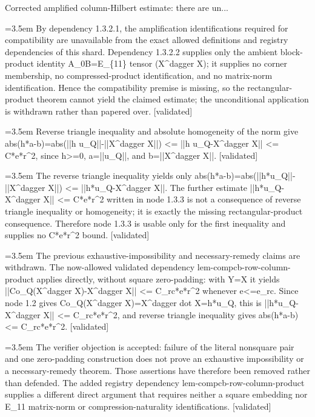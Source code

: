 \documentclass{article}
\newcommand{\step}[1]{\par\noindent\hangindent=3.5em\hangafter=1%
  \makebox[3.5em][l]{\textbf{#1.}}}
\newcommand{\steptag}[1]{\hfill{\small\textsf{[#1]}}}
\begin{document}
\begin{proofbox}{Corrected amplified column-Hilbert estimate: there are un...}
\step{1.3.2.3.2} By dependency 1.3.2.1, the amplification identifications required for compatibility are unavailable from the exact allowed definitions and registry dependencies of this shard. Dependency 1.3.2.2 supplies only the ambient block-product identity A\_0B=E\_\{11\} tensor (X\textasciicircum{}dagger X); it supplies no corner membership, no compressed-product identification, and no matrix-norm identification. Hence the compatibility premise is missing, so the rectangular-product theorem cannot yield the claimed estimate; the unconditional application is withdrawn rather than papered over. \steptag{validated} \\[4pt]
\step{1.3.3} Reverse triangle inequality and absolute homogeneity of the norm give abs(h*a-b)=abs(||h u\_Q||-||X\textasciicircum{}dagger X||) <= ||h u\_Q-X\textasciicircum{}dagger X|| <= C*e*r\textasciicircum{}2, since h>=0, a=||u\_Q||, and b=||X\textasciicircum{}dagger X||. \steptag{validated} \\[4pt]
\step{1.3.4} The reverse triangle inequality yields only abs(h*a-b)=abs(||h*u\_Q||-||X\textasciicircum{}dagger X||) <= ||h*u\_Q-X\textasciicircum{}dagger X||. The further estimate ||h*u\_Q-X\textasciicircum{}dagger X|| <= C*e*r\textasciicircum{}2 written in node 1.3.3 is not a consequence of reverse triangle inequality or homogeneity; it is exactly the missing rectangular-product consequence. Therefore node 1.3.3 is usable only for the first inequality and supplies no C*e*r\textasciicircum{}2 bound. \steptag{validated} \\[4pt]
\step{1.3.5} The previous exhaustive-impossibility and necessary-remedy claims are withdrawn. The now-allowed validated dependency lem-compcb-row-column-product applies directly, without square zero-padding: with Y=X it yields ||Co\_Q(X\textasciicircum{}dagger X)-X\textasciicircum{}dagger X|| <= C\_rc*e*r\textasciicircum{}2 whenever e<=e\_rc. Since node 1.2 gives Co\_Q(X\textasciicircum{}dagger X)=X\textasciicircum{}dagger dot X=h*u\_Q, this is ||h*u\_Q-X\textasciicircum{}dagger X|| <= C\_rc*e*r\textasciicircum{}2, and reverse triangle inequality gives abs(h*a-b) <= C\_rc*e*r\textasciicircum{}2. \steptag{validated} \\[6pt]
\step{1.3.5.1} The verifier objection is accepted: failure of the literal nonsquare pair and one zero-padding construction does not prove an exhaustive impossibility or a necessary-remedy theorem. Those assertions have therefore been removed rather than defended. The added registry dependency lem-compcb-row-column-product supplies a different direct argument that requires neither a square embedding nor E\_11 matrix-norm or compression-naturality identifications. \steptag{validated} \\[4pt]

\end{proofbox}
\end{document}
